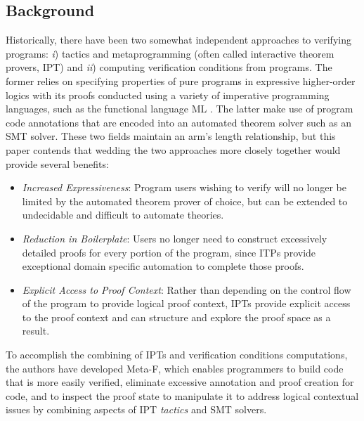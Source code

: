 \documentclass[10pt, journal]{IEEEtran}
\begin{document}
\subsection{Background}
Historically, there have been two somewhat independent approaches to verifying programs: \textit{i}) tactics and metaprogramming (often called interactive theorem provers, IPT) and \textit{ii}) computing verification conditions from programs. The former relies on specifying properties of pure programs in expressive higher-order logics with its proofs conducted using a variety of imperative programming languages, such as the functional language ML \cite{Milner1997}. The latter make use of program code annotations that are encoded into an automated theorem solver such as an SMT solver. These two fields maintain an arm's length relationship, but this paper contends that wedding the two approaches more closely together would provide several benefits:
\begin{itemize}
	\item \textit{Increased Expressiveness}: Program users wishing to verify will no longer be limited by the automated theorem prover of choice, but can be extended to undecidable and difficult to automate theories.
	\item \textit{Reduction in Boilerplate}: Users no longer need to construct excessively detailed proofs for every portion of the program, since ITPs provide exceptional domain specific automation to complete those proofs.
	\item \textit{Explicit Access to Proof Context}: Rather than depending on the control flow of the program to provide logical proof context, IPTs provide explicit access to the proof context and can structure and explore the proof space as a result.
\end{itemize}
To accomplish the combining of IPTs and verification conditions computations, the authors have developed Meta-F\text{*}, which enables programmers to build code that is more easily verified, eliminate excessive annotation and proof creation for code, and to inspect the proof state to manipulate it to address logical contextual issues by combining aspects of IPT \textit{tactics} and SMT solvers.
\end{document}
